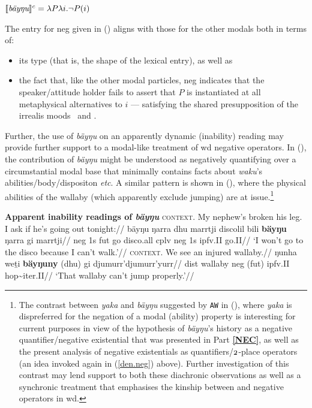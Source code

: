 \pex
\a[label=b]$ {\denote[c]{\textit{bäyŋu}}=\lambda P\lambda i.\neg P(i)} $\label{den:neg.simp}
\xe

The entry for \gls{neg} given in () aligns with those for the other modals both in terms of:
\begin{itemize}\item  its type (that is, the shape of the lexical entry), as well as \item the fact that, like the other modal particles, \gls{neg} indicates that the speaker/attitude holder fails to assert that $ P $ is instantiated at all metaphysical alternatives to $ i $ --- satisfying the shared presupposition of the irrealis moods \II~and \IV. 
\end{itemize}

Further, the use of \textit{bäyŋu} on an apparently dynamic (inability) reading may provide further support to a modal-like treatment of \acrshort{wd} negative operators. In (), the contribution of \textit{bäyŋu} might be understood as negatively quantifying over a circumstantial modal base that minimally contains facts about \textit{waku}'s abilities/body/dispositon \textit{etc}. A similar pattern is shown in (), where the physical abilities of the wallaby (which apparently exclude jumping) are at issue.\footnote{The contrast between \textit{yaka} and \textit{bäyŋu} suggested by \texttt{AW} in (), where \textit{yaka} is dispreferred for the negation of a modal (ability) property is interesting for current purposes in view of the hypothesis of \textit{bäyŋu}'s history as a negative quantifier/negative existential that was presented in Part \textbf{\ref{NEC}}, as well as the present analysis of negative existentials as quantifiers/$ \mathnormal2 $-place operators (an idea invoked again in (\ref{den.neg}) above). Further investigation of this contrast may lend support to both these diachronic observations as well as a synchronic treatment that emphasises the kinship between  and negative operators in \gls{wd}.}


\pex\textbf{Apparent inability readings of \textit{bäyŋu}}
\a\begingl\glpreamble \textsc{context.} My nephew's broken his leg. I ask if he's going out tonight://
\gla bäyŋu ŋarra dhu marrtji discolil bili \textbf{bäyŋu} ŋarra gi marrtji//
\glb \gls{neg} 1s \gls{fut} go disco.\gls{all} \gls{cplv} \gls{neg} 1s \gls{ipfv}.\gls{II} go.\gls{II}//
\glft`I won't go to the disco because I can't walk.’\trailingcitation{[MG~20180802]}//\endgl
\a\begingl\glpreamble\textsc{context.} We see an injured wallaby.//
\gla ŋunha weṯi  \textbf{bäyŋuny} (dhu) gi djumurr'djumurr'yurr//
\glb \gls{dist} wallaby \gls{neg} (\gls{fut}) \gls{ipfv}.\gls{II} hop\textasciitilde\gls{iter}.\gls{II}//
\glft`That wallaby can't jump properly.'\trailingcitation{[AW~20180731]}//\endgl
\xe


